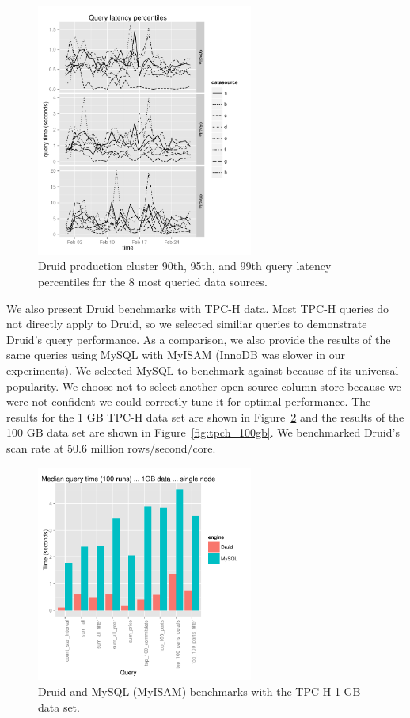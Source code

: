 \documentclass{acm_proc_article-sp}
\begin{document}
\begin{figure}
\centering
\includegraphics[width = 2.8in]{query_percentiles}
\caption{Druid production cluster 90th, 95th, and 99th query latency percentiles for the 8 most queried data sources.}
\label{fig:query_percentiles}
\end{figure}

We also present Druid benchmarks with TPC-H data. Most TPC-H queries do not
directly apply to Druid, so we selected similiar queries to demonstrate Druid's
query performance. As a comparison, we also provide the results of the same
queries using MySQL with MyISAM (InnoDB was slower in our experiments). We
selected MySQL to benchmark against because of its universal popularity. We
choose not to select another open source column store because we were not
confident we could correctly tune it for optimal performance. The results for
the 1 GB TPC-H data set are shown in Figure~\ref{fig:tpch_1gb} and the results
of the 100 GB data set are shown in Figure~\ref{fig:tpch_100gb}. We benchmarked
Druid's scan rate at 50.6 million rows/second/core.

\begin{figure}
\centering
\includegraphics[width = 2.8in]{tpch_1gb}
\caption{Druid and MySQL (MyISAM) benchmarks with the TPC-H 1 GB data set.}
\label{fig:tpch_1gb}
\end{figure}
\end{document}
